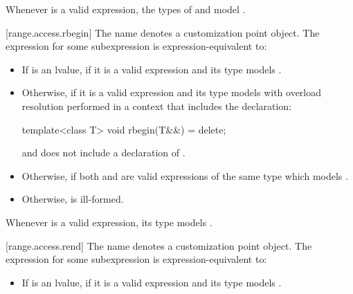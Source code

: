 \begin{addedblock}
\pnum
\begin{note}
Whenever  is a valid expression, the
types of  and  model
.
\end{note}

[range.access.rbegin]{}
\pnum
The name  denotes a customization point
object. The expression
 for some subexpression  is
expression-equivalent to:

\begin{itemize}
\item
  If  is an lvalue, 
  if it is a valid expression and its type  models .

\item
  Otherwise,  if it is a valid
  expression and its type  models  with overload
  resolution performed in a context that includes the declaration:
  \begin{codeblock}
  template<class T> void rbegin(T&&) = delete;
  \end{codeblock}
  and does not include a declaration of .

\item
  Otherwise,  if both
   and  are valid
  expressions of the same type  which models
  .

\item
  Otherwise,  is ill-formed.
\end{itemize}

\pnum
\begin{note}
Whenever  is a valid expression, its type models
.
\end{note}

[range.access.rend]{}
\pnum
The name  denotes a customization point
object. The expression
 for some subexpression  is
expression-equivalent to:

\begin{itemize}
\item
  If  is an lvalue, 
  if it is a valid expression and its type  models
  .


\end{itemize}
\end{addedblock}
